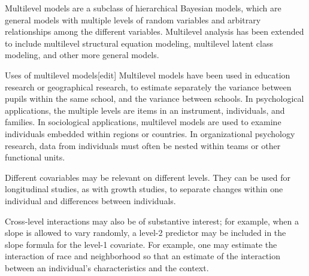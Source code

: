 Multilevel models are a subclass of hierarchical Bayesian models, which are general models with multiple levels of random variables and arbitrary relationships among the different variables. Multilevel analysis has been extended to include multilevel structural equation modeling, multilevel latent class modeling, and other more general models.

Uses of multilevel models[edit]
Multilevel models have been used in education research or geographical research, to estimate separately the variance between pupils within the same school, and the variance between schools. In psychological applications, the multiple levels are items in an instrument, individuals, and families. In sociological applications, multilevel models are used to examine individuals embedded within regions or countries. In organizational psychology research, data from individuals must often be nested within teams or other functional units.

Different covariables may be relevant on different levels. They can be used for longitudinal studies, as with growth studies, to separate changes within one individual and differences between individuals.

Cross-level interactions may also be of substantive interest; for example, when a slope is allowed to vary randomly, a level-2 predictor may be included in the slope formula for the level-1 covariate. For example, one may estimate the interaction of race and neighborhood so that an estimate of the interaction between an individual's characteristics and the context.
